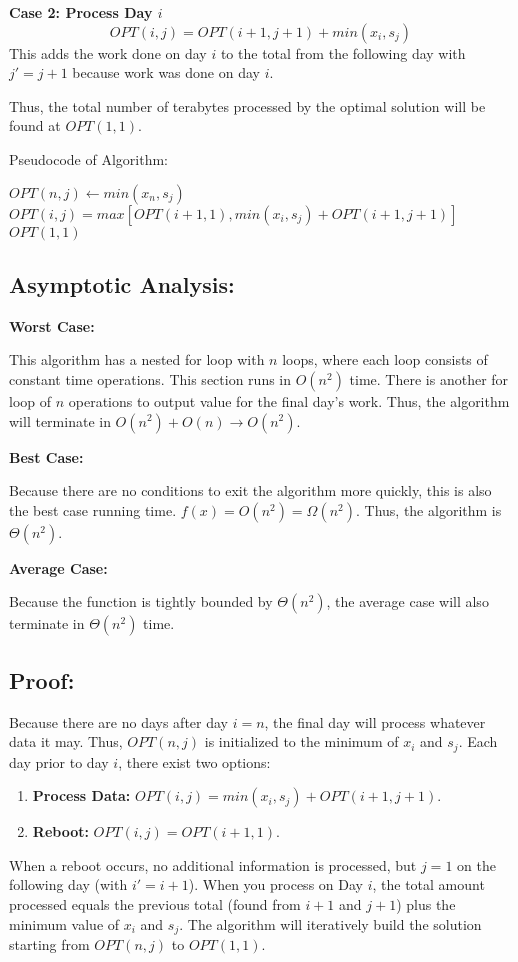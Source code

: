 \documentclass{article}
\begin{document}
\noindent \textbf{Case 2:  Process Day $i$} \newline
$$OPT(i, j) = OPT(i+1, j+1) + min(x_i, s_j) $$
This adds the work done on day $i$ to the total from the following day with $j' = j+1$ because work was done on day $i$.

\noindent Thus, the total number of terabytes processed by the optimal solution will be found at $OPT(1, 1)$.

\begin{algorithm}[h!]
\caption{Pseudocode of Algorithm:}
\begin{algorithmic}
	\State $OPT(n, j) \gets min(x_n, s_j)$
\EndFor
{}
		\State $OPT(i, j) = max[ OPT(i+1, 1), min(x_i, s_j) + OPT(i+1, j+1)]$
	\EndFor
\EndFor
\State \Return $OPT(1, 1)$
\end{algorithmic}
\end{algorithm}

\subsection*{Asymptotic Analysis:}
\noindent \textbf{Worst Case:}

This algorithm has a nested for loop with $n$ loops, where each loop consists of constant time operations.  This section runs in $O(n^2)$ time.  There is another for loop of $n$ operations to output value for the final day's work. Thus, the algorithm will terminate in $O(n^2) + O(n) \rightarrow O(n^2)$.

\noindent \textbf{Best Case:}

Because there are no conditions to exit the algorithm more quickly, this is also the best case running time.  $f(x) = O(n^2) = \Omega(n^2)$.  Thus, the algorithm is $\Theta(n^2)$.

\noindent \textbf{Average Case:}

Because the function is tightly bounded by $\Theta(n^2)$, the average case will also terminate in $\Theta(n^2)$ time.

\subsection*{Proof:}
Because there are no days after day $i = n$, the final day will process whatever data it may.  Thus, $OPT(n, j)$ is initialized to the minimum of $x_i$ and $s_j$.  
Each day prior to day $i$, there exist two options:
\begin{enumerate}
	\item \textbf{Process Data:}  $OPT(i, j) = min(x_i, s_j) + OPT(i+1, j+1)$.  
	\item \textbf{Reboot:}  $OPT(i,j) = OPT(i+1, 1)$.
\end{enumerate}
When a reboot occurs, no additional information is processed, but $j = 1$ on the following day (with $i' = i+1$). 
When you process on Day $i$, the total amount processed equals the previous total (found from $i+1$ and $j+1$) plus the minimum value of $x_i$ and $s_j$.
The algorithm will iteratively build the solution starting from $OPT(n, j)$ to $OPT(1, 1)$.
\end{document}
